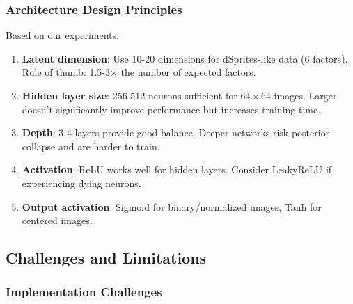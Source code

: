 \documentclass[conference]{IEEEtran}
\begin{document}
\subsubsection{Architecture Design Principles}

Based on our experiments:
\begin{enumerate}
    \item \textbf{Latent dimension}: Use 10-20 dimensions for dSprites-like data (6 factors). Rule of thumb: 1.5-3× the number of expected factors.
    
    \item \textbf{Hidden layer size}: 256-512 neurons sufficient for $64 \times 64$ images. Larger doesn't significantly improve performance but increases training time.
    
    \item \textbf{Depth}: 3-4 layers provide good balance. Deeper networks risk posterior collapse and are harder to train.
    
    \item \textbf{Activation}: ReLU works well for hidden layers. Consider LeakyReLU if experiencing dying neurons.
    
    \item \textbf{Output activation}: Sigmoid for binary/normalized images, Tanh for centered images.
\end{enumerate}

\subsection{Challenges and Limitations}

\subsubsection{Implementation Challenges}
\end{document}
